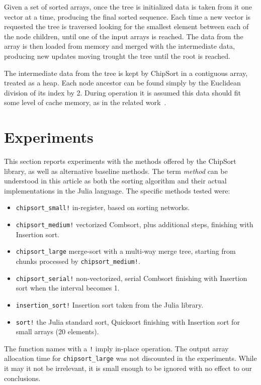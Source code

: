 \documentclass{juliacon}
\begin{document}
Given a set of sorted arrays, once the tree is initialized data is taken from it one vector at a time, producing the final sorted sequence. Each time a new vector is requested the tree is traversed looking for the smallest element between each of the node children, until one of the input arrays is reached. The data from the array is then loaded from memory and merged with the intermediate data, producing new updates moving trought the tree until the root is reached.

The intermediate data from the tree is kept by ChipSort in a contiguous array, treated as a heap. Each node ancestor can be found simply by the Euclidean division of its index by 2. During operation it is assumed this data should fit some level of cache memory, as in the related work~\cite{DBLP:conf/IEEEpact/InoueMKN07,DBLP:journals/pvldb/ChhuganiNLMHCBKD08,DBLP:journals/pvldb/InoueT15}.


\section{Experiments}
\label{sec:experiments}
%
This section reports experiments with the methods offered by the ChipSort library, as well as alternative baseline methods. The term {\it method} can be understood in this article as both the sorting algorithm and their actual implementations in the Julia language. The specific methods tested were:
\begin{itemize}
\item {\tt chipsort\_small!} in-register, based on sorting networks.
\item {\tt chipsort\_medium!} vectorized Combsort, plus additional steps, finishing with Insertion sort.
\item {\tt chipsort\_large} merge-sort with a multi-way merge tree, starting from chunks processed by {\tt chipsort\_medium!}.
\item {\tt chipsort\_serial!} non-vectorized, serial Combsort finishing with Insertion sort when the interval becomes 1.
\item {\tt insertion\_sort!} Insertion sort taken from the Julia library.
\item {\tt sort!} the Julia standard sort, Quicksort finishing with Insertion sort for small arrays (20 elements).
\end{itemize}

The function names with a {\tt !} imply in-place operation. The output array allocation time for {\tt chipsort\_large} was not discounted in the experiments. While it may it not be irrelevant, it is small enough to be ignored with no effect to our conclusions.
\end{document}
